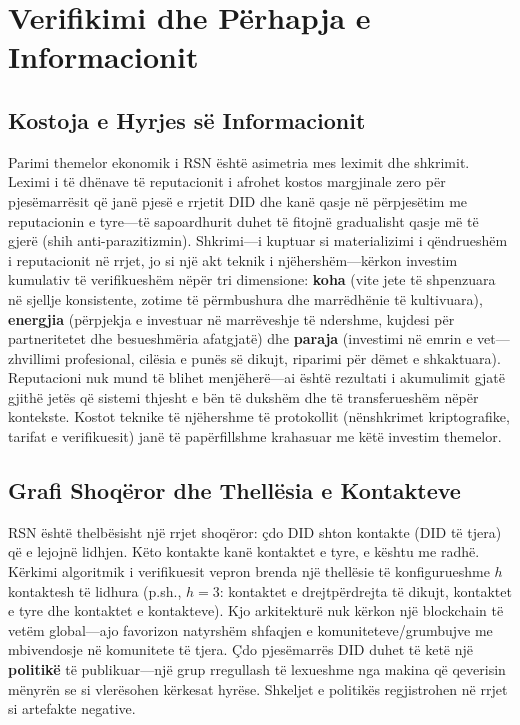\documentclass[11pt,a4paper,twocolumn]{article}
\begin{document}
\section{Verifikimi dhe Përhapja e Informacionit}

\subsection{Kostoja e Hyrjes së Informacionit}

Parimi themelor ekonomik i RSN është asimetria mes leximit dhe shkrimit. Leximi i të dhënave të reputacionit i afrohet kostos margjinale zero për pjesëmarrësit që janë pjesë e rrjetit DID dhe kanë qasje në përpjesëtim me reputacionin e tyre---të sapoardhurit duhet të fitojnë gradualisht qasje më të gjerë (shih anti-parazitizmin). Shkrimi---i kuptuar si materializimi i qëndrueshëm i reputacionit në rrjet, jo si një akt teknik i njëhershëm---kërkon investim kumulativ të verifikueshëm nëpër tri dimensione: \textbf{koha} (vite jete të shpenzuara në sjellje konsistente, zotime të përmbushura dhe marrëdhënie të kultivuara), \textbf{energjia} (përpjekja e investuar në marrëveshje të ndershme, kujdesi për partneritetet dhe besueshmëria afatgjatë) dhe \textbf{paraja} (investimi në emrin e vet---zhvillimi profesional, cilësia e punës së dikujt, riparimi për dëmet e shkaktuara). Reputacioni nuk mund të blihet menjëherë---ai është rezultati i akumulimit gjatë gjithë jetës që sistemi thjesht e bën të dukshëm dhe të transferueshëm nëpër kontekste. Kostot teknike të njëhershme të protokollit (nënshkrimet kriptografike, tarifat e verifikuesit) janë të papërfillshme krahasuar me këtë investim themelor.

\subsection{Grafi Shoqëror dhe Thellësia e Kontakteve}

RSN është thelbësisht një rrjet shoqëror: çdo DID shton kontakte (DID të tjera) që e lejojnë lidhjen. Këto kontakte kanë kontaktet e tyre, e kështu me radhë. Kërkimi algoritmik i verifikuesit vepron brenda një thellësie të konfigurueshme $h$ kontaktesh të lidhura (p.sh., $h=3$: kontaktet e drejtpërdrejta të dikujt, kontaktet e tyre dhe kontaktet e kontakteve). Kjo arkitekturë nuk kërkon një blockchain të vetëm global---ajo favorizon natyrshëm shfaqjen e komuniteteve/grumbujve me mbivendosje në komunitete të tjera. Çdo pjesëmarrës DID duhet të ketë një \textbf{politikë} të publikuar---një grup rregullash të lexueshme nga makina që qeverisin mënyrën se si vlerësohen kërkesat hyrëse. Shkeljet e politikës regjistrohen në rrjet si artefakte negative.
\end{document}
